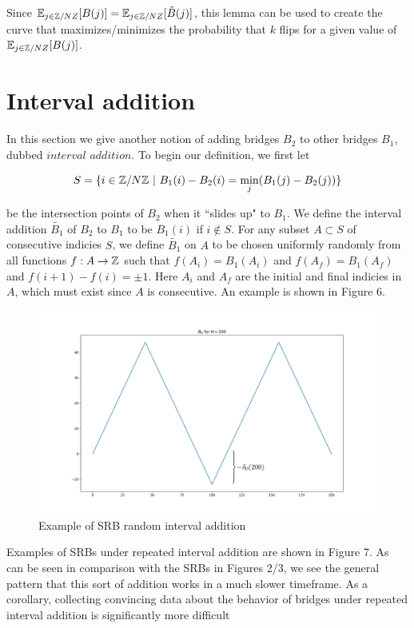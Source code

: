 \documentclass{article}
\theoremstyle{definition}
\begin{document}
Since $\mathbb{E}_{j\in\mathbb{Z}/NZ}[B(j)]=\mathbb{E}_{j\in\mathbb{Z}/NZ}[\tilde{B}(j)]$, this lemma can be used to create the curve that maximizes/minimizes the probability that $k$ flips for a given value of $\mathbb{E}_{j\in\mathbb{Z}/NZ}[B(j)]$.


\section{Interval addition}

In this section we give another notion of adding bridges $B_2$ to other bridges $B_1$, dubbed $\mathit{interval \,\,addition}$. To begin our definition, we first let

$$S=\{i\in \mathbb{Z}/N\mathbb{Z} \,\,|\,\, B_1(i)-B_2(i)=\min_j(B_1(j)-B_2(j))\}$$

be the intersection points of $B_2$ when it ``slides up" to $B_1$. We define the interval addition $\tilde{B_1}$ of $B_2$ to $B_1$ to be $B_1(i)$ if $i\not\in S$. For any subset $A\subset S$ of consecutive indicies $S$, we define $\tilde{B_1}$ on $A$ to be chosen uniformly randomly from all functions $f:A\to \mathbb{Z}$ such that $f(A_{i})=B_1(A_{i})$ and $f(A_{f})=B_1(A_{f})$ and $f(i+1)-f(i)=\pm1$. Here $A_i$ and $A_f$ are the initial and final indicies in $A$, which must exist since $A$ is consecutive. An example is shown in Figure 6.

\begin{figure}[h!]
\caption{Example of SRB random interval addition}
\centering
\includegraphics[width=.7\textwidth]{Figure_6}
\end{figure}


Examples of SRBs under repeated interval addition are shown in Figure 7. As can be seen in comparison with the SRBs in Figures 2/3, we see the general pattern that this sort of addition works in a much slower timeframe. As a corollary, collecting convincing data about the behavior of bridges under repeated interval addition is significantly more difficult
\end{document}
